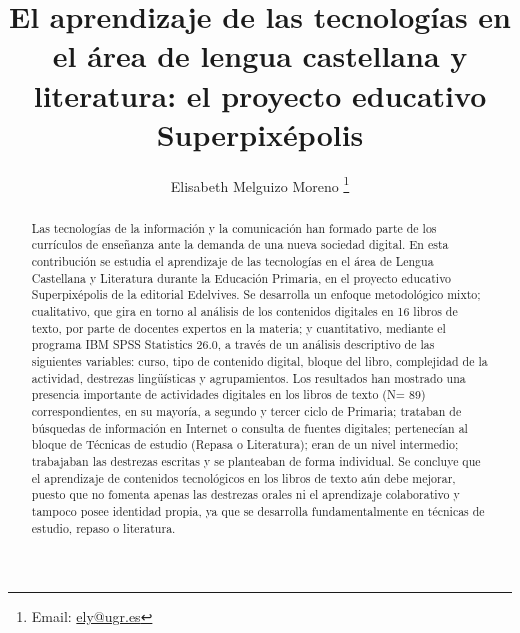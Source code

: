 \documentclass[spanish]{textolivre}
\title{El aprendizaje de las tecnologías en el área de lengua castellana y literatura: el proyecto educativo Superpixépolis}
\author[1]{Elisabeth Melguizo Moreno \orcid{0000-0001-6964-964X} \thanks{Email: \url{ely@ugr.es}}}
\affil[1]{Universidad de Granada, Granada, España.}
\begin{document}
\maketitle

\begin{polyabstract}
\begin{abstract}
Las tecnologías de la información y la comunicación han formado parte de los currículos de enseñanza ante la demanda de una nueva sociedad digital. En esta contribución se estudia el aprendizaje de las tecnologías en el área de Lengua Castellana y Literatura durante la Educación Primaria, en el proyecto educativo Superpixépolis de la editorial Edelvives. Se desarrolla un enfoque metodológico mixto; cualitativo, que gira en torno al análisis de los contenidos digitales en 16 libros de texto, por parte de docentes expertos en la materia; y cuantitativo, mediante el programa IBM SPSS Statistics 26.0, a través de un análisis descriptivo de las siguientes variables: curso, tipo de contenido digital, bloque del libro, complejidad de la actividad, destrezas lingüísticas y agrupamientos. Los resultados han mostrado una presencia importante de actividades digitales en los libros de texto (N= 89) correspondientes, en su mayoría, a segundo y tercer ciclo de Primaria; trataban de búsquedas de información en Internet o consulta de fuentes digitales; pertenecían al bloque de Técnicas de estudio (Repasa o Literatura); eran de un nivel intermedio; trabajaban las destrezas escritas y se planteaban de forma individual. Se concluye que el aprendizaje de contenidos tecnológicos en los libros de texto aún debe mejorar, puesto que no fomenta apenas las destrezas orales ni el aprendizaje colaborativo y tampoco posee identidad propia, ya que se desarrolla fundamentalmente en técnicas de estudio, repaso o literatura.

\end{abstract}


\end{polyabstract}
\end{document}
